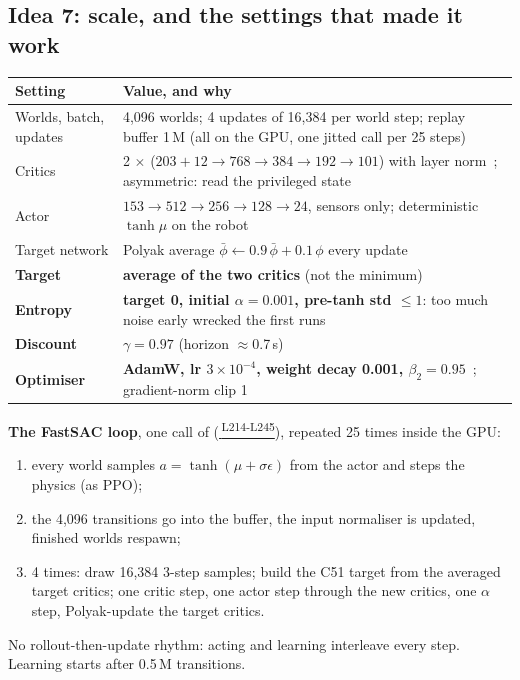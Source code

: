 \documentclass[10pt,letterpaper]{article}
\newcommand{\ghs}[2]{\href{https://github.com/soujanya957/capstan-drive-leg/blob/e0ecfe6/CapstanPedal/fullbuild_v4/#1\##2}{\texttt{\detokenize{#1}}\,\textsuperscript{\tiny #2}}}
\newcommand{\cc}[1]{\texttt{\detokenize{#1}}}
\begin{document}
\subsection{Idea 7: scale, and the settings that made it work}
\begin{small}
\begin{tabularx}{\linewidth}{@{}lX@{}}
\toprule
\textbf{Setting} & \textbf{Value, and why} \\ \midrule
Worlds, batch, updates & 4{,}096 worlds; 4 updates of 16{,}384 per world step; replay buffer 1\,M (all on the GPU, one jitted call per 25 steps) \\
Critics & 2 $\times$ ($203+12\to768\to384\to192\to101$) with layer norm~\cite{ba2016}; asymmetric: read the privileged state~\cite{pinto2018} \\
Actor & $153\to512\to256\to128\to24$, sensors only; deterministic $\tanh\mu$ on the robot \\
Target network & Polyak average $\bar\phi\leftarrow0.9\,\bar\phi+0.1\,\phi$ every update \\
\textbf{Target} & \textbf{average of the two critics} (not the minimum) \\
\textbf{Entropy} & \textbf{target 0, initial $\alpha=0.001$, pre-tanh std $\le1$}: too much noise early wrecked the first runs \\
\textbf{Discount} & \textbf{$\gamma=0.97$} (horizon $\approx$0.7\,s) \\
\textbf{Optimiser} & \textbf{AdamW, lr $3\times10^{-4}$, weight decay 0.001, $\beta_2=0.95$}~\cite{loshchilov2019}; gradient-norm clip 1 \\ \bottomrule
\end{tabularx}
\end{small}

\begin{note}
\textbf{The FastSAC loop}, one call of \cc{chunk()} (\ghs{rl2/train_sac.py}{L214-L245}), repeated 25 times inside the GPU:
\begin{enumerate}[leftmargin=1.4em]
\item every world samples $a=\tanh(\mu+\sigma\epsilon)$ from the actor and steps the physics (as PPO);
\item the 4{,}096 transitions go into the buffer, the input normaliser is updated, finished worlds respawn;
\item 4 times: draw 16{,}384 3-step samples; build the C51 target from the averaged target critics; one critic step, one actor
step through the new critics, one $\alpha$ step, Polyak-update the target critics.
\end{enumerate}
No rollout-then-update rhythm: acting and learning interleave every step. Learning starts after 0.5\,M transitions.
\end{note}
\end{document}
